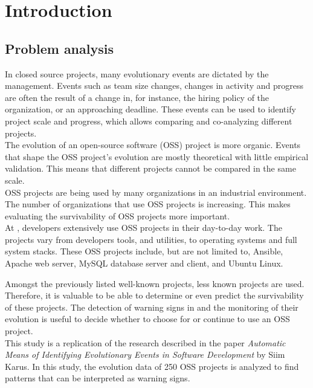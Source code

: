 \chapter{Introduction}
\label{introduction}

\section{Problem analysis}

In closed source projects, many evolutionary events are dictated by the
management.
Events such as team size changes, changes in activity and progress are often the
result of a change in, for instance, the hiring policy of the organization, or
an approaching deadline. These events can be used to identify project scale and
progress, which allows comparing and co-analyzing different projects.\\

The evolution of an open-source software (OSS) project is more organic. Events
that shape the OSS project's evolution are mostly theoretical with little
empirical validation. This means that different projects cannot be compared
in the same scale.\\

OSS projects are being used by many organizations in an industrial environment.
The number of organizations that use OSS projects is increasing. This makes
evaluating the survivability of OSS projects more important.\\

At \theOrganization, developers extensively use OSS projects in their day-to-day
work. The projects vary from developers tools, and utilities, to operating
systems and full system stacks. These OSS projects include, but are not limited
to, Ansible, Apache web server, MySQL database server and client, and Ubuntu
Linux.

Amongst the previously listed well-known projects, less known projects are used.
Therefore, it is valuable to be able to determine or even predict the
survivability of these projects. The detection of warning signs in and the
monitoring of their evolution is useful to decide whether to choose for or
continue to use an OSS project.\\

This study is a replication of the research described in the paper
\emph{Automatic Means of Identifying Evolutionary Events in Software
Development} by Siim Karus. In this study, the evolution data of 250 OSS
projects is analyzed to find patterns that can be interpreted as warning
signs.

